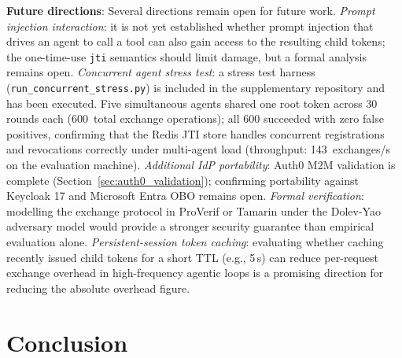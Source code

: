 \documentclass[journal]{IEEEtran}
\begin{document}
\textbf{Future directions}:
Several directions remain open for future work.
\textit{Prompt injection interaction}: it is not yet established whether prompt
injection that drives an agent to call a tool can also gain access to the
resulting child tokens; the one-time-use \texttt{jti} semantics should limit
damage, but a formal analysis remains open.
\textit{Concurrent agent stress test}: a stress test harness
(\texttt{run\_concurrent\_stress.py}) is included in the supplementary
repository and has been executed. Five simultaneous agents shared one root
token across 30 rounds each (600~total exchange operations); all 600
succeeded with zero false positives, confirming that the Redis JTI store
handles concurrent registrations and revocations correctly under multi-agent
load (throughput: 143~exchanges/s on the evaluation machine).
\textit{Additional IdP portability}: Auth0 M2M validation is complete
(Section~\ref{sec:auth0_validation}); confirming portability against Keycloak 17
and Microsoft Entra OBO remains open.
\textit{Formal verification}: modelling the exchange protocol in ProVerif
\cite{blanchet2001} or Tamarin \cite{meier2013} under the Dolev-Yao adversary
model would provide a stronger security guarantee than empirical evaluation alone.
\textit{Persistent-session token caching}: evaluating whether caching recently
issued child tokens for a short TTL (e.g., 5\,s) can reduce per-request exchange
overhead in high-frequency agentic loops is a promising direction for reducing
the absolute overhead figure.


\FloatBarrier  %

\section{Conclusion}
\label{sec:conclusion}
\end{document}
